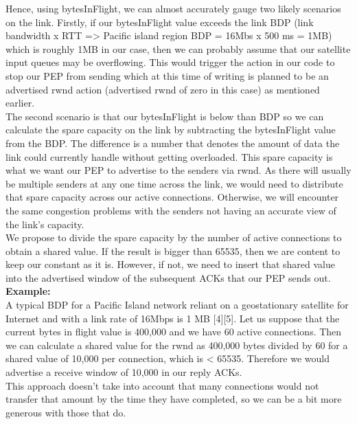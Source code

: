 \documentclass{uathesis}
\begin{document}
Hence, using bytesInFlight, we can almost accurately gauge two likely scenarios on the link. Firstly, if our bytesInFlight value exceeds the link BDP (link bandwidth x RTT => Pacific island region BDP = 16Mbs x 500 ms = 1MB) which is roughly 1MB in our case, then we can probably assume that our satellite input queues may be overflowing. This would trigger the action in our code to stop our PEP from sending which at this time of writing is planned to be an advertised rwnd action (advertised rwnd of zero in this case) as mentioned earlier. \\

The second scenario is that our bytesInFlight is below than BDP so we can calculate the spare capacity on the link by subtracting the bytesInFlight value from the BDP. The difference is a number that denotes the amount of data the link could currently handle without getting overloaded. This spare capacity is what we want our PEP to advertise to the senders via rwnd. As there will usually be multiple senders at any one time across the link, we would need to distribute that spare capacity across our active connections. Otherwise, we will encounter the same congestion problems with the senders not having an accurate view of the link's capacity.\\

We propose to divide the spare capacity by the number of active connections to obtain a shared value. If the result is bigger than 65535, then we are content to keep our constant as it is. However, if not, we need to insert that shared value into the advertised window of the subsequent ACKs that our PEP sends out. \\

\textbf{Example:}\\

A typical BDP for a Pacific Island network reliant on a geostationary satellite for Internet and with a link rate of 16Mbps is 1 MB [4][5]. Let us suppose that the current bytes in flight value is 400,000 and we have 60 active connections. Then we can calculate a shared value for the rwnd as 400,000 bytes divided by 60 for a shared value of 10,000 per connection, which is < 65535. Therefore we would advertise a receive window of 10,000 in our reply ACKs.\\

This approach doesn't take into account that many connections would not transfer that amount by the time they have completed, so we can be a bit more generous with those that do.
 
\end{document}
